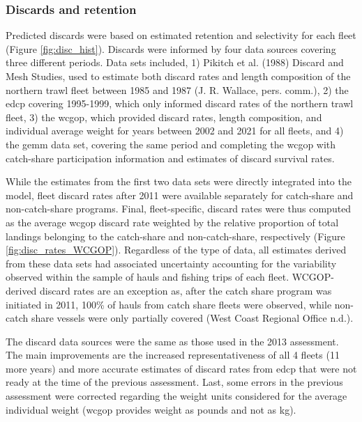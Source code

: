 \documentclass[11pt,
  english,
  letterpaper,
]{article}
\begin{document}
\hypertarget{discards-and-retention}{%
\subsubsection{Discards and retention}\label{discards-and-retention}}

Predicted discards were based on estimated retention and selectivity for each fleet (Figure \ref{fig:disc_hist}). Discards were informed by four data sources covering three different periods. Data sets included, 1) Pikitch et al. (1988) Discard and Mesh Studies, used to estimate both discard rates and length composition of the northern trawl fleet between 1985 and 1987 (J. R. Wallace, pers. comm.), 2) the \gls{edcp} covering 1995-1999, which only informed discard rates of the northern trawl fleet, 3) the \gls{wcgop}, which provided discard rates, length composition, and individual average weight for years between 2002 and 2021 for all fleets, and 4) the \gls{gemm} data set, covering the same period and completing the \gls{wcgop} with catch-share participation information and estimates of discard survival rates.

While the estimates from the first two data sets were directly integrated into the model, fleet discard rates after 2011 were available separately for catch-share and non-catch-share programs. Final, fleet-specific, discard rates were thus computed as the average \gls{wcgop} discard rate weighted by the relative proportion of total landings belonging to the catch-share and non-catch-share, respectively (Figure \ref{fig:disc_rates_WCGOP}). Regardless of the type of data, all estimates derived from these data sets had associated uncertainty accounting for the variability observed within the sample of hauls and fishing trips of each fleet. WCGOP-derived discard rates are an exception as, after the catch share program was initiated in 2011, 100\% of hauls from catch share fleets were observed, while non-catch share vessels were only partially covered (West Coast Regional Office n.d.).

The discard data sources were the same as those used in the 2013 assessment. The main improvements are the increased representativeness of all 4 fleets (11 more years) and more accurate estimates of discard rates from \gls{edcp} that were not ready at the time of the previous assessment. Last, some errors in the previous assessment were corrected regarding the weight units considered for the average individual weight (\gls{wcgop} provides weight as pounds and not as kg).
\end{document}
